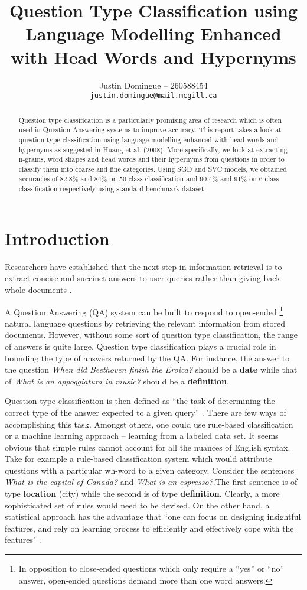\documentclass[11pt]{article}
\title{Question Type Classification using Language Modelling Enhanced with Head Words and Hypernyms}
\author{Justin Domingue --
  260588454 \\
  {\tt justin.domingue@mail.mcgill.ca}
  }
\date{}
\begin{document}
\maketitle
\begin{abstract}
Question type classification is a particularly promising area of research which is often used in Question Answering systems to improve accuracy. This report takes a look at question type classification using language modelling enhanced with head words and hypernyms as suggested in Huang et al. (2008). More specifically, we look at extracting n-grams, word shapes and head words and their hypernyms from questions in order to classify them into coarse and fine categories. Using SGD and SVC models, we obtained accuracies of 82.8\% and 84\% on 50 class classification and 90.4\% and 91\% on 6 class classification respectively using standard benchmark dataset.

\end{abstract}

\section{Introduction}

Researchers have established that the next step in information retrieval is to extract concise and succinct answers to user queries rather than giving back whole documents \cite{sunblad}.

A Question Answering (QA) system can be built to respond to open-ended \footnote{In opposition to close-ended questions which only require a ``yes'' or ``no'' answer, open-ended questions demand more than one word answers.} natural language questions by retrieving the relevant information from stored documents. However, without some sort of question type classification, the range of answers is quite large. Question type classification plays a crucial role in bounding the type of answers returned by the QA. For instance, the answer to the question \textit{When did Beethoven finish the Eroica?} should be a \textbf{date} while that of \textit{What is an appoggiatura in music?} should be a \textbf{definition}. 

Question type classification is then defined as ``the task of determining the correct type of the answer expected to a given query'' \cite{khoury}. There are few ways of accomplishing this task. Amongst others, one could use rule-based classification or a machine learning approach -- learning from a labeled data set. It seems obvious that simple rules cannot account for all the nuances of English syntax. Take for example a rule-based classification system which would attribute questions with a particular wh-word to a given category. Consider the sentences \textit{What is the capital of Canada?} and \textit{What is an espresso?}.The first sentence is of type \textbf{location} (city) while the second is of type \textbf{definition}. Clearly, a more sophisticated set of rules would need to be devised. On the other hand, a statistical approach has the advantage that ``one can focus on designing insightful features, and rely on learning process to efficiently and effectively cope with the features" \cite{huang}.
\end{document}
